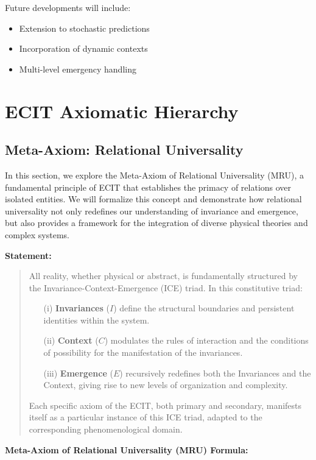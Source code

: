 \documentclass{article}
\begin{document}
Future developments will include:
\begin{itemize}
\item Extension to stochastic predictions
\item Incorporation of dynamic contexts
\item Multi-level emergency handling
\end{itemize}


\section{ECIT Axiomatic Hierarchy}
\label{sec:axiomas}

\subsection{Meta-Axiom: Relational Universality}
In this section, we explore the Meta-Axiom of Relational Universality (MRU), a fundamental principle of ECIT that establishes the primacy of relations over isolated entities. We will formalize this concept and demonstrate how relational universality not only redefines our understanding of invariance and emergence, but also provides a framework for the integration of diverse physical theories and complex systems.

\bigskip

\noindent \textbf{Statement:}
\begin{quote}
All reality, whether physical or abstract, is fundamentally structured by the Invariance-Context-Emergence (ICE) triad. In this constitutive triad:

\begin{enumerate}
\item[(i)] \textbf{Invariances} ($I$) define the structural boundaries and persistent identities within the system.
\item[(ii)] \textbf{Context} ($C$) modulates the rules of interaction and the conditions of possibility for the manifestation of the invariances.
\item[(iii)] \textbf{Emergence} ($E$) recursively redefines both the Invariances and the Context, giving rise to new levels of organization and complexity.
\end{enumerate}
Each specific axiom of the ECIT, both primary and secondary, manifests itself as a particular instance of this ICE triad, adapted to the corresponding phenomenological domain.
\end{quote}
\bigskip
\textbf{Meta-Axiom of Relational Universality (MRU) Formula:}
\end{document}
